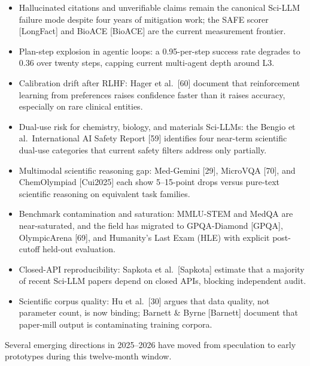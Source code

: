 \begin{itemize}
\tightlist
\item
  Hallucinated citations and unverifiable claims remain the canonical Sci-LLM failure mode despite four years of mitigation work; the SAFE scorer {[}LongFact{]} and BioACE {[}BioACE{]} are the current measurement frontier.
\item
  Plan-step explosion in agentic loops: a 0.95-per-step success rate degrades to 0.36 over twenty steps, capping current multi-agent depth around L3.
\item
  Calibration drift after RLHF: Hager et al.~{[}60{]} document that reinforcement learning from preferences raises confidence faster than it raises accuracy, especially on rare clinical entities.
\item
  Dual-use risk for chemistry, biology, and materials Sci-LLMs: the Bengio et al.~International AI Safety Report {[}59{]} identifies four near-term scientific dual-use categories that current safety filters address only partially.
\item
  Multimodal scientific reasoning gap: Med-Gemini {[}29{]}, MicroVQA {[}70{]}, and ChemOlympiad {[}Cui2025{]} each show 5--15-point drops versus pure-text scientific reasoning on equivalent task families.
\item
  Benchmark contamination and saturation: MMLU-STEM and MedQA are near-saturated, and the field has migrated to GPQA-Diamond {[}GPQA{]}, OlympicArena {[}69{]}, and Humanity's Last Exam (HLE) with explicit post-cutoff held-out evaluation.
\item
  Closed-API reproducibility: Sapkota et al.~{[}Sapkota{]} estimate that a majority of recent Sci-LLM papers depend on closed APIs, blocking independent audit.
\item
  Scientific corpus quality: Hu et al.~{[}30{]} argues that data quality, not parameter count, is now binding; Barnett \& Byrne {[}Barnett{]} document that paper-mill output is contaminating training corpora.
\end{itemize}

Several emerging directions in 2025--2026 have moved from speculation to early prototypes during this twelve-month window.

